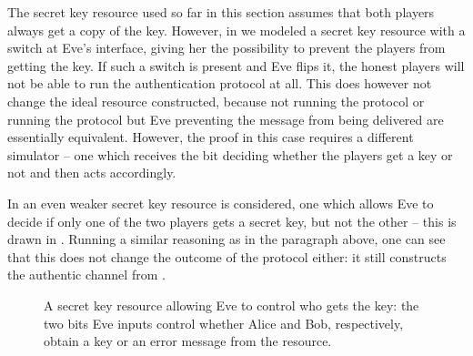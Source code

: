 The secret key resource used so far in this section assumes that both
players always get a copy of the key. However, in  we
modeled a secret key resource with a switch at Eve's interface, giving
her the possibility to prevent the players from getting the key. If
such a switch is present and Eve flips it, the honest players will not
be able to run the authentication protocol at all. This does however
not change the ideal resource constructed, because not running the
protocol or running the protocol but Eve preventing the message from
being delivered are essentially equivalent. However, the proof in this
case requires a different simulator \--- one which receives the bit
deciding whether the players get a key or not and then acts accordingly.

In  an even weaker secret key resource is
considered, one which allows Eve to decide if only one of the two
players gets a secret key, but not the other \--- this is drawn in
. Running a similar reasoning as in the
paragraph above, one can see that this does not change the outcome of
the protocol either: it still constructs the authentic channel from
.

\begin{figure}[tb]




\caption[Secret key resource with two
switches]{\label{fig:key.resource}A secret key resource allowing Eve
  to control who gets the key: the two bits Eve inputs control whether
  Alice and Bob, respectively, obtain a key or an error message from
  the resource.}
\end{figure}

